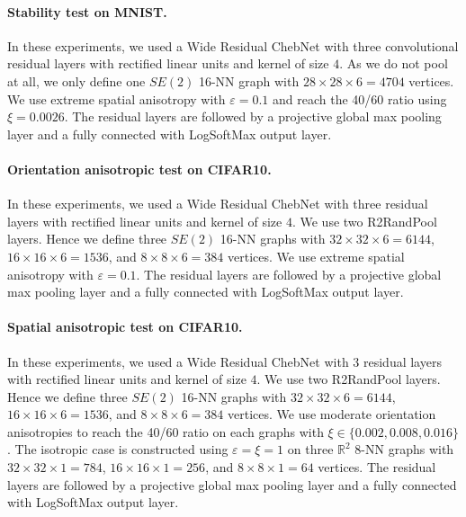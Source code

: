 \documentclass{article}
\begin{document}
\paragraph{Stability test on MNIST.} In these experiments, we used a Wide Residual ChebNet with three convolutional residual layers with rectified linear units and kernel of size $4$. As we do not pool at all, we only define one $SE(2)$ 16-NN graph with $28 \times 28 \times 6 = 4704$ vertices. We use extreme spatial anisotropy with $\varepsilon = 0.1$ and reach the 40/60 ratio using $\xi = 0.0026$. The residual layers are followed by a projective global max pooling layer and a fully connected with LogSoftMax output layer. 

\paragraph{Orientation anisotropic test on CIFAR10.} In these experiments, we used a Wide Residual ChebNet with three residual layers with rectified linear units and kernel of size $4$. We use two R2RandPool layers. Hence we define three $SE(2)$ 16-NN graphs with $32 \times 32 \times 6= 6144$, $16 \times 16 \times 6 = 1536$, and $8 \times 8 \times 6 = 384$ vertices. We use extreme spatial anisotropy with $\varepsilon = 0.1$. The residual layers are followed by a projective global max pooling layer and a fully connected with LogSoftMax output layer. 

\paragraph{Spatial anisotropic test on CIFAR10.} In these experiments, we used a Wide Residual ChebNet with 3 residual layers with rectified linear units and kernel of size $4$. We use two R2RandPool layers. Hence we define three $SE(2)$ 16-NN graphs with $32 \times 32 \times 6= 6144$, $16 \times 16 \times 6 = 1536$, and $8 \times 8 \times 6 = 384$ vertices. We use moderate orientation anisotropies to reach the 40/60 ratio on each graphs with $\xi \in \{0.002, 0.008, 0.016\}$. The isotropic case is constructed using $\varepsilon = \xi = 1$ on three $\mathbb{R}^2$ 8-NN graphs with $32 \times 32 \times 1 = 784$, $16 \times 16 \times 1 = 256$, and $8 \times 8 \times 1 = 64$ vertices. The residual layers are followed by a projective global max pooling layer and a fully connected with LogSoftMax output layer.
\end{document}
